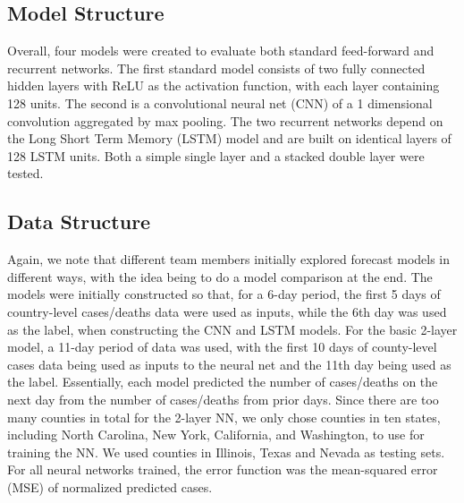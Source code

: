 ﻿\documentclass{article}
\begin{document}
\begin{multicols}{2}
\subsection*{Model Structure}

Overall, four models were created to evaluate both standard feed-forward
and recurrent networks.
The first standard model consists of two fully connected hidden layers with ReLU
as the activation function, with each layer containing 128 units.
The second is a convolutional neural net (CNN) of a 1 dimensional convolution
aggregated by max pooling.
The two recurrent networks depend on the Long Short Term Memory (LSTM) model and
are built on identical layers of 128 LSTM units.
Both a simple single layer and a stacked double layer were tested.

\subsection*{Data Structure}

Again, we note that different team members initially explored forecast models in
different ways, with the idea being to do a model comparison at the end. The
models were initially constructed so that, for a 6-day period, the first 5 days
of country-level cases/deaths data were used as inputs, while the 6th day was
used as the label, when constructing the CNN and LSTM models. For the basic
2-layer model, a 11-day period of data was used, with the first 10 days of
county-level cases data being used as inputs to the neural net and the 11th day
being used as the label. Essentially, each model predicted the number of
cases/deaths on the next day from the number of cases/deaths from prior days.
Since there are too many counties in total for the 2-layer NN, we only chose
counties in ten states, including North Carolina, New York, California, and
Washington, to use for training the NN. We used counties in Illinois, Texas and
Nevada as testing sets. For all neural networks trained, the error function was
the mean-squared error (MSE) of normalized predicted cases.


\end{multicols}
\end{document}
